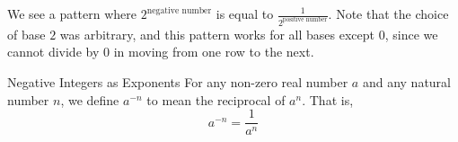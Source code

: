 \documentclass{ximera}
\begin{document}
  We see a pattern where $2^{\text{negative number}}$ is equal to $\frac{1}{2^{\text{positive number}}}$.
      Note that the choice of base $2$ was arbitrary,
      and this pattern works for all bases except $0$,
      since we cannot divide by $0$ in moving from one row to the next.

\begin{remark}
     Negative Integers as Exponents
          For any non-zero real number $a$ and any natural number $n$,
          we define $a^{-n}$ to mean the reciprocal of $a^n$. That is,
$$      
 a^{-n} = \frac{1}{a^n}
   $$
     
    \end{remark}
\end{document}
